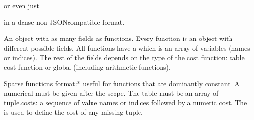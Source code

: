 \documentclass[letterpaper,10pt,openany,oneside,english]{sphinxmanual}
\begin{document}
\begin{sphinxVerbatim}[commandchars=\\\{\}]
\PYG{p}{[}\PYG{p}{[}  \PYG{p}{]}  \PYG{p}{]}
\end{sphinxVerbatim}

\sphinxAtStartPar
or even just

\begin{sphinxVerbatim}[commandchars=\\\{\}]
\PYG{p}{[}  \PYG{p}{]}
\end{sphinxVerbatim}

\sphinxAtStartPar
in a dense non JSON\sphinxhyphen{}compatible format.

\sphinxAtStartPar
{}

\sphinxAtStartPar
An object with as many fields as functions. Every function is an object with different possible fields. All functions have a  which is an array of variables (names or indices). The rest of the fields depends on the type of the cost function: table cost function or global (including arithmetic functions).

\sphinxAtStartPar
{}

\sphinxAtStartPar
Sparse functions format:* useful for functions that are dominantly constant. A numerical  must be given after the scope. The  table must be an array of tuple.costs: a sequence of value names or indices followed by a numeric cost. The  is used to define the cost of any missing tuple.

\begin{sphinxVerbatim}[commandchars=\\\{\}]
 \PYG{p}{[} \PYG{p}{]}
  
  \PYG{p}{[}  
             
             \PYG{p}{]} 
\end{sphinxVerbatim}
\end{document}
